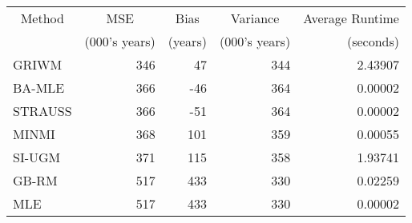 
\begin{tabular}{lrrrr}
\toprule
\multicolumn{1}{c}{Method} & \multicolumn{1}{c}{MSE} & \multicolumn{1}{c}{Bias} & \multicolumn{1}{c}{Variance} & \multicolumn{1}{c}{Average Runtime} \\
\cmidrule(l{3pt}r{3pt}){1-1} \cmidrule(l{3pt}r{3pt}){2-2} \cmidrule(l{3pt}r{3pt}){3-3} \cmidrule(l{3pt}r{3pt}){4-4} \cmidrule(l{3pt}r{3pt}){5-5}
 & (000's years) & (years) & (000's years) & (seconds)\\
\midrule
GRIWM & 346 & 47 & 344 & 2.43907\\
BA-MLE & 366 & -46 & 364 & 0.00002\\
STRAUSS & 366 & -51 & 364 & 0.00002\\
MINMI & 368 & 101 & 359 & 0.00055\\
SI-UGM & 371 & 115 & 358 & 1.93741\\
\addlinespace
GB-RM & 517 & 433 & 330 & 0.02259\\
MLE & 517 & 433 & 330 & 0.00002\\
\bottomrule
\end{tabular}
